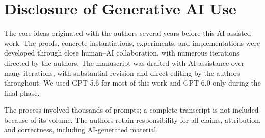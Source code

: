 \section{Disclosure of Generative AI Use}
\label{sec:ai-disclosure}

The core ideas originated with the authors several years before this
AI-assisted work. The proofs, concrete instantiations, experiments,
and implementations were developed through close human--AI collaboration,
with numerous iterations directed by the authors. The manuscript was drafted
with AI assistance over many iterations, with substantial revision and
direct editing by the authors throughout.
We used GPT-5.6 for most of this work and GPT-6.0 only during the final phase.

The process involved thousands of prompts; a complete transcript is not
included because of its volume. The authors retain responsibility for all
claims, attribution, and correctness, including AI-generated material.
